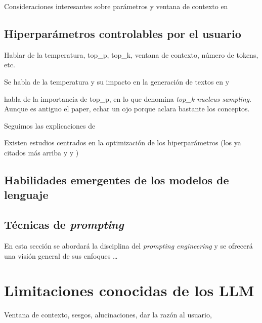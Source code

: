 Consideraciones interesantes sobre parámetros y ventana de contexto en \cite{gonzaloAsomandonosVentanaContextual2023}

\subsection{Hiperparámetros controlables por el usuario}
\label{sec:hiperparametros_controlables}
Hablar de la temperatura, top\_p, top\_k, ventana de contexto, número de tokens, etc. 

Se habla de la temperatura y su impacto en la generación de textos en \cite{holtzmanCuriousCaseNeural2020} y \cite{chamandFinetuneYourClassifier2022}

\cite{holtzmanCuriousCaseNeural2020} habla de la importancia de top\_p, en lo que denomina \textit{top\_k nucleus sampling}. Aunque es antiguo el paper, echar un ojo porque aclara bastante los conceptos.

Seguimos las explicaciones de \cite{rothmanTransformersNaturalLanguage2021}

Existen estudios centrados en la optimización de los hiperparámetros (los ya citados más arriba y \cite{wangCostEffectiveHyperparameterOptimization2023} y \cite{wangHyperparameterOptimizationAlgorithm2022})


\subsection{Habilidades emergentes de los modelos de lenguaje}
\subsection{Técnicas de \textit{prompting}}
\label{sec:llm_tecnicas_prompting}
En esta sección se abordará la disciplina del \textit{prompting engineering} y se ofrecerá una visión general de sus enfoques \citep{LLMPromptingGuide}\dots


\section{Limitaciones conocidas de los LLM}
Ventana de contexto, sesgos, alucinaciones, dar la razón al usuario, 

